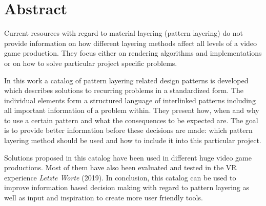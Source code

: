 
\chapter{Abstract}

Current resources with regard to material layering (pattern layering) do not provide information on how different layering methods affect all levels of a video game production. They focus either on rendering algorithms and implementations or on how to solve particular project specific problems.

In this work a catalog of pattern layering related design patterns is developed which describes solutions to recurring problems in a standardized form. The individual elements form a structured language of interlinked patterns including all important information of a problem within. They present how, when and why to use a certain pattern and what the consequences to be expected are. The goal is to provide better information before these decisions are made: which pattern layering method should be used and how to include it into this particular project. 

Solutions proposed in this catalog have been used in different huge video game productions. Most of them have also been evaluated and tested in the VR experience \emph{Letzte Worte} (2019). In conclusion, this catalog can be used to improve information based decision making with regard to pattern layering as well as input and inspiration to create more user friendly tools.  


